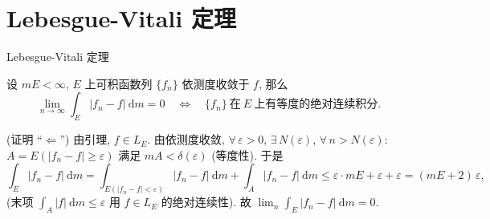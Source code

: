 
\section[Vitali]{Lebesgue-Vitali 定理}


\begin{frame}{Lebesgue-Vitali 定理}

\begin{thm}
设 $mE < \infty$, $E$ 上可积函数列 $\{f_n\}$ \alert{依测度}收敛于 $f$, 那么
\[
\lim_{n \to \infty} \int_E |f_n - f| ~ \mathrm{d} m = 0
\quad \Longleftrightarrow \quad
\{f_n\}\ \text{在}\ E\ \text{上有等度的绝对连续积分} .
\]
\end{thm}

\pause

\startproof[bg=yellow, fg=red](证明 ``$\Leftarrow$'')
由引理, $f \in L_E$. 由依测度收敛, $\forall\, \varepsilon > 0$, $\exists\, N(\varepsilon)$,
$\forall\, n > N(\varepsilon)$:
$A = E(|f_n - f| \geqslant \varepsilon)$ 满足 $mA < \delta(\varepsilon)$ (等度性). 于是
\[
\int_E |f_n - f| ~ \mathrm{d} m
= \int_{E(|f_n - f| < \varepsilon)} |f_n - f| ~ \mathrm{d} m
+ \int_A |f_n - f| ~ \mathrm{d} m
\leqslant \varepsilon \cdot mE + \varepsilon + \varepsilon
= (mE + 2)\, \varepsilon ,
\]
(末项 $\int_A |f| ~ \mathrm{d} m \leqslant \varepsilon$ 用 $f \in L_E$ 的绝对连续性).
故 $\lim_n \int_E |f_n - f| ~ \mathrm{d} m = 0$.

\end{frame}


